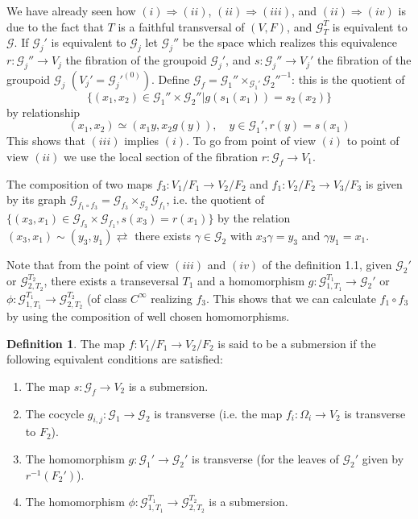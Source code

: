 \documentclass[12pt]{amsart}
\theoremstyle{definition}
\newtheorem{defn}[thm]{Definition}
\theoremstyle{remark}
\numberwithin{equation}{section}
\newcommand{\CG}{{\mathcal G}}
\begin{document}
We have already seen how $(i) \Rightarrow (ii)$, $(ii) \Rightarrow (iii)$, and $(ii) \Rightarrow (iv)$ is due to the fact that $T$ is a faithful transversal of $(V, F)$, and $\CG^T_T$ is equivalent to $\CG$. If $\CG_j'$ is equivalent to $\CG_j$ let $\CG_j''$ be the space which realizes this equivalence $r: \CG_j'' \to V_j$ the fibration of the groupoid $\CG_j'$, and $s: \CG_j'' \to V_j'$ the fibration of the groupoid $\CG_j$ $(V_j' = \CG_j'^{(0)})$. Define $\CG_f = \CG_1'' \times_{\CG_1'} \CG_2''^{-1}$: this is the quotient of 
$$
\{(x_1, x_2) \in \CG_1'' \times \CG_2'' | g(s_1(x_1)) = s_2(x_2) \}
$$
by relationship
$$
(x_1, x_2) \simeq (x_1y, x_2 g(y)), \quad y \in \CG_1', r(y) = s(x_1)
$$
This shows that $(iii)$ implies $(i)$. To go from point of view $(i)$ to point of view $(ii)$ we use the local section of the fibration $r: \CG_f \to V_1.$

The composition of two maps $f_3: V_1/F_1 \to 
V_2/F_2$ and $f_1: V_2/F_2 \to V_3/F_3$ is given by its graph $\CG_{f_1\circ f_3} = \CG_{f_3} \times _{\CG_2} \CG_{f_1}$, i.e. the quotient of $\{(x_3, x_1) \in \CG_{f_3} \times \CG_{f_1}, s(x_3) = r(x_1)\}$ by the relation $(x_3, x_1) \sim (y_3, y_1) \rightleftarrows$ there exists $\gamma \in \CG_2$ with $x_3 \gamma = y_3$ and $\gamma y_1 = x_1$.

Note that from the point of view $(iii)$ and $(iv)$ of the definition 1.1, given $\CG_2'$ or $\CG_{2, T_2}^{T_2}$, there exists a transeversal $T_1$ and a homomorphism $g: \CG_{1, T_1}^{T_1} \to \CG_2'$ or $\phi: \CG_{1, T_1}^{T_1} \to \CG_{2, T_2}^{T_2} $ (of class $C^{\infty}$ realizing $f_3$. This shows that we can calculate $f_1\circ f_3$ by using the composition of well chosen homomorphisms.
\begin{defn}
The map $f: V_1/F_1 \to V_2/F_2$ is said to be a submersion if the following equivalent conditions are satisfied:
\begin{enumerate}
    \item The map $s: \CG_f \to V_2$ is a submersion.
    \item The cocycle $g_{i, j}: \CG_1 \to \CG_2$ is transverse (i.e. the map $f_i: \Omega_i \to V_2 $ is transverse to $F_2$).
    \item The homomorphism $g: \CG_1' \to \CG_2'$ is transverse (for the leaves of $\CG_2'$ given by $r^{-1}(F_2')$).
    \item The homomorphism $\phi: \CG_{1, T_1}^{T_1} \to \CG_{2, T_2}^{T_2} $ is a submersion.
\end{enumerate}
\end{defn}
\end{document}
